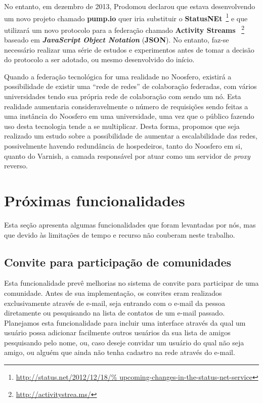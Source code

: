 No entanto, em dezembro de 2013, Prodomou declarou que estava desenvolvendo
um novo projeto chamado \textbf{pump.io} quer iria substituir o
\textbf{StatusNEt}~\footnote{\url{http://status.net/2012/12/18/%
upcoming-changes-in-the-status-net-service}} e que utilizará um novo
protocolo para a federação chamado \textbf{Activity Streams}%
~\footnote{\url{http://activitystrea.ms/}} baseado em \textbf{\textit{%
JavaScript Object Notation}} (\textbf{JSON}).
%
No entanto, faz-se necessário realizar uma série de estudos e experimentos
antes de tomar a decisão do protocolo a ser adotado, ou mesmo desenvolvido
do início.

Quando a federação tecnológica for uma realidade no Noosfero, existirá a
possibilidade de existir uma ``rede de redes'' de colaboração federadas,
com vários universidades tendo sua própria rede de colaboração com sendo
um nó.
%
Esta realidade aumentaria consideravelmente o número de requisições sendo
feitas a uma instância do Noosfero em uma universidade, uma vez que o público
fazendo uso desta tecnologia tende a se multiplicar.
%
Desta forma, propomos que seja realizado um estudo sobre a possibilidade
de aumentar a escalabilidade das redes, possivelmente havendo redundância
de hospedeiros, tanto do Noosfero em si, quanto do Varnish, a camada
responsável por atuar como um servidor de \textit{proxy} reverso.


\section{Próximas funcionalidades}

Esta seção apresenta algumas funcionalidades que foram levantadas por nós, mas
que devido às limitações de tempo e recurso não couberam neste trabalho.

\subsection{Convite para participação de comunidades}

Esta funcionalidade prevê melhorias no sistema de convite para participar de
uma comunidade. Antes de sua implementação, os convites eram realizados
exclusivamente através de e-mail, seja entrando com o e-mail da pessoa
diretamente ou pesquisando na lista de contatos de um e-mail passado.
%
Planejamos esta funcionalidade para incluir uma interface através da qual um
usuário possa adicionar facilmente outros usuários da sua lista de amigos pesquisando
pelo nome, ou, caso deseje convidar um usuário do qual não seja amigo, ou alguém
que ainda não tenha cadastro na rede através do e-mail.

